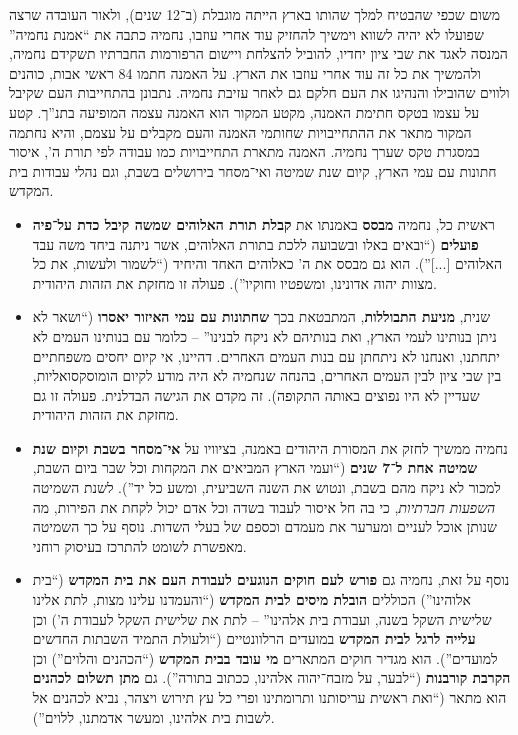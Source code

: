 \documentclass[]{article}
\begin{document}
\begin{enumerate}[A.]
        משום שכפי שהבטיח למלך שהותו בארץ הייתה מוגבלת (ב־12 שנים), ולאור העובדה שרצה שפועלו לא יהיה לשווא וימשיך להחזיק עוד אחרי עוזבו, נחמיה כתבה את ``אמנת נחמיה'' המנסה לאגד את שבי ציון יחדיו, להוביל להצלחת ויישום הרפורמות החברתיו תשקידם נחמיה, ולהמשיך את כל זה עוד אחרי עוזבו את הארץ. על האמנה חתמו 84 ראשי אבות, כוהנים ולווים שהובילו והנהיגו את העם חלקם גם לאחר עזיבת נחמיה. נתבונן בהתחייבות העם שקיבל על עצמו בטקס חתימת האמנה, מקטע המקור הוא האמנה עצמה המופיעה בתנ''ך. קטע המקור מתאר את ההתחייבויות שחותמי האמנה והעם מקבלים על עצמם, והיא נחתמה במסגרת טקס שערך נחמיה. האמנה מתארת התחייבויות כמו עבודה לפי תורת ה', איסור חתונות עם עמי הארץ, קיום שנת שמיטה ואי־מסחר בירושלים בשבת,  וגם נהלי עבודות בית המקדש. 
        
        \begin{itemize}
            \item
             ראשית כל, נחמיה \textbf{מבסס} באמנתו את\textbf{ קבלת תורת האלוהים שמשה קיבל כדת על־פיה פועלים} (``ובאים באלו ובשבועה ללכת בתורת האלוהים, אשר ניתנה ביחד משה עבד האלוהים [...]''). הוא גם מבסס את ה' כאלוהים האחד והיחיד (``לשמור ולעשות, את כל מצוות יהוה אדונינו, ומשפטיו וחוקיו''). פעולה זו מחזקת את הזהות היהודית. 
            
            \item         
            שנית, \textbf{מניעת התבוללות}, המתבטאת בכך \textbf{שחתונות עם עמי האיזור יאסרו} (``ושאר לא ניתן בנותינו לעמי הארץ, ואת בנותיהם לא ניקח לבנינו'' – כלומר עם בנותינו העמים לא יתחתנו, ואנחנו לא ניתחתן עם בנות העמים האחרים. דהיינו, אי קיום יחסים משפחתיים בין שבי ציון לבין העמים האחרים, בהנחה שנחמיה לא היה מודע לקיום הומוסקסואליות, שעדיין לא היו נפוצים באותה התקופה). זה מקדם את הגישה הבדלנית. פעולה זו גם מחזקת את הזהות היהודית. 
            
            \item 
            נחמיה ממשיך לחזק את המסורת היהודים באמנה, בציוויו על \textbf{אי־מסחר בשבת וקיום שנת שמיטה אחת ל־7 שנים} (``ועמי הארץ המביאים את המקחות וכל שבר ביום השבת, למכור לא ניקח מהם בשבת, ונטוש את השנה השביעית, ומשע כל יד''). לשנת השמיטה \textit{השפעות חברתיות}, כי בה חל איסור לעבוד בשדה וכל אדם יכול לקחת את הפירות, מה שנותן אוכל לעניים ומערער את מעמדם וכספם של בעלי השדות. נוסף על כך השמיטה מאפשרת לשומט להתרכז בעיסוק רוחני. 
            
            \item
            נוסף על זאת, נחמיה גם \textbf{פורש לעם חוקים הנוגעים לעבודת העם את בית המקדש} (``בית אלוהינו'') הכוללים \textbf{הובלת מיסים לבית המקדש} (``והעמדנו עלינו מצות, לתת אלינו שלישית השקל בשנה, ועבודת בית אלהינו'' – לתת את שלישית השקל לעבודת ה') וכן \textbf{עלייה לרגל לבית המקדש} במועדים הרלוונטיים (``ולעולת התמיד השבתות החדשים למועדים''). הוא מגדיר חוקים המתארים \textbf{מי עובד בבית המקדש} (``הכהנים והלוים'') וכן \textbf{הקרבת קורבנות} (``לבער, על מזבח־יהוה אלהינו, ככתוב בתורה''). גם \textbf{מתן תשלום לכהנים} הוא מתאר (``ואת ראשית עריסותנו ותרומתינו ופרי כל עץ תירוש ויצהר, נביא לכהנים אל לשבות בית אלהינו, ומעשר אדמתנו, ללוים''). 
        \end{itemize}
        

\end{enumerate}
\end{document}
